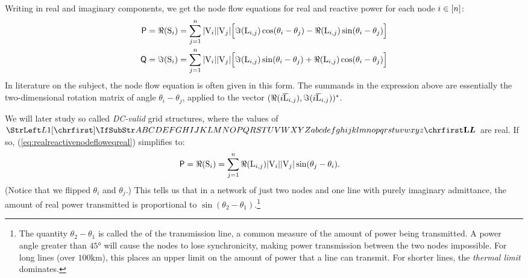 \documentclass[main.tex]{subfiles}
\begin{document}
\begin{remark}
Writing in real and imaginary components, we get the node flow equations for real and reactive power for each node $i \in [n]$:
\begin{align}
    \mathsf{P}=\Re ({\mathrm{S}}_i) &= \sum_{j=1}^{n} |{\mathrm{V}}_i| |{\mathrm{V}}_{j}| \Big[\Im({\mathrm{L}}_{i,j})\cos(\theta_i - \theta_j)-\Re({\mathrm{L}}_{i,j})\sin(\theta_i - \theta_j)\Big]
    \label{eq:realreactivenodefloweqreal}
    \\
    \mathsf{Q}=\Im ({\mathrm{S}}_i) &= \sum_{j=1}^{n} |{\mathrm{V}}_i| |{\mathrm{V}}_{j}|\Big[\Im({\mathrm{L}}_{i,j})\sin(\theta_i - \theta_j)+\Re({\mathrm{L}}_{i,j})\cos(\theta_i - \theta_j)\Big]
    \label{eq:realreactivenodefloweqreactive}
\end{align}
In literature on the subject, the node flow equation is often given in this form. The summands in the expression above are essentially the two-dimensional rotation matrix of angle $\theta_i - \theta_j$, applied to the vector $(\Re(i \overline{{\mathrm{L}}}_{i,j}), \Im(i \overline{{\mathrm{L}}}_{i,j}))^*$.

We will later study so called \emph{DC-valid} grid structures, where the values of $\mat{L}$ are real. If so, (\ref{eq:realreactivenodefloweqreal}) simplifies to:
\begin{align*}
    \mathsf{P}=\Re ({\mathrm{S}}_i) &= \sum_{j=1}^{n} \Re({\mathrm{L}}_{i,j}) |{\mathrm{V}}_i| |{\mathrm{V}}_{j}| \sin(\theta_j - \theta_i).
\end{align*}
(Notice that we flipped $\theta_i$ and $\theta_j$.)
This tells us that in a network of just two nodes and one line with purely imaginary admittance, the amount of real power transmitted is proportional to $\sin (\theta_2-\theta_1)$.\footnote{The quantity $\theta_2 - \theta_1$ is called the  of the transmission line, a common measure of the amount of power being transmitted. A power angle greater than $45\si{\degree}$ will cause the nodes to lose synchronicity, making power transmission between the two nodes impossible. \citep{VonMeier2006} For long lines (over $100\si{\kilo\meter}$), this  places an upper limit on the amount of power that a line can transmit. For shorter lines, the \emph{thermal limit} dominates.}


\end{remark}
\end{document}
